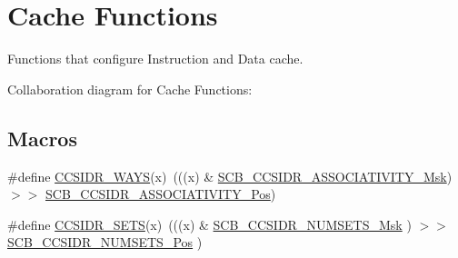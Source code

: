 \hypertarget{group___c_m_s_i_s___core___cache_functions}{}\section{Cache Functions}
\label{group___c_m_s_i_s___core___cache_functions}


Functions that configure Instruction and Data cache.  


Collaboration diagram for Cache Functions\+:
\subsection*{Macros}
\begin{DoxyCompactItemize}
\item 
\#define \hyperlink{group___c_m_s_i_s___core___cache_functions_ga3d672529cd193537fe2a0141931c6ad9}{C\+C\+S\+I\+D\+R\+\_\+\+W\+A\+YS}(x)~(((x) \& \hyperlink{group___c_m_s_i_s___s_c_b_gae093c4c635dad43845967512fa87173a}{S\+C\+B\+\_\+\+C\+C\+S\+I\+D\+R\+\_\+\+A\+S\+S\+O\+C\+I\+A\+T\+I\+V\+I\+T\+Y\+\_\+\+Msk}) $>$$>$ \hyperlink{group___c_m_s_i_s___s_c_b_gae67f2f83976b819fb3039fc35cfef0fb}{S\+C\+B\+\_\+\+C\+C\+S\+I\+D\+R\+\_\+\+A\+S\+S\+O\+C\+I\+A\+T\+I\+V\+I\+T\+Y\+\_\+\+Pos})
\item 
\#define \hyperlink{group___c_m_s_i_s___core___cache_functions_gaf20feee7c52fee32b48ee0d2ceaaf932}{C\+C\+S\+I\+D\+R\+\_\+\+S\+E\+TS}(x)~(((x) \& \hyperlink{group___c_m_s_i_s___s_c_b_ga47d1f01185d7a039334031008386c5a8}{S\+C\+B\+\_\+\+C\+C\+S\+I\+D\+R\+\_\+\+N\+U\+M\+S\+E\+T\+S\+\_\+\+Msk}      ) $>$$>$ \hyperlink{group___c_m_s_i_s___s_c_b_ga1028d2c238f74d2aa021f53ffbe8d7ab}{S\+C\+B\+\_\+\+C\+C\+S\+I\+D\+R\+\_\+\+N\+U\+M\+S\+E\+T\+S\+\_\+\+Pos}      )
\end{DoxyCompactItemize}
